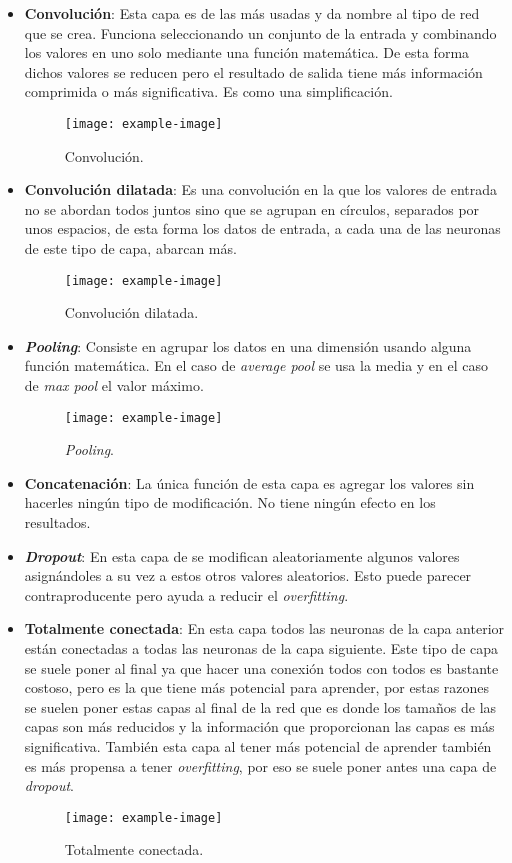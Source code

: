 \documentclass[12pt,a4paper]{article}
\begin{document}
\begin{itemize}
\item \textbf{Convolución}: Esta capa es de las más usadas y da nombre al tipo de red que se crea. Funciona seleccionando un conjunto de la entrada y combinando los valores en uno solo mediante una función matemática. De esta forma dichos valores se reducen pero el resultado de salida tiene más información comprimida o más significativa. Es como una simplificación.
\begin{figure}[H]
\centering
\texttt{[image: example-image]}
\caption{Convolución.}
\end{figure}

\item \textbf{Convolución dilatada}: Es una convolución en la que los valores de entrada no se abordan todos juntos sino que se agrupan en círculos, separados por unos espacios, de esta forma los datos de entrada, a cada una de las neuronas de este tipo de capa, abarcan más.
\begin{figure}[H]
\centering
\texttt{[image: example-image]}
\caption{Convolución dilatada.}
\end{figure}

\item \textbf{\textit{Pooling}}: Consiste en agrupar los datos en una dimensión usando alguna función matemática. En el caso de \textit{average pool} se usa la media y en el caso de \textit{max pool} el valor máximo.
\begin{figure}[H]
\centering
\texttt{[image: example-image]}
\caption{\textit{Pooling}.}
\end{figure}

\item \textbf{Concatenación}: La única función de esta capa es agregar los valores sin hacerles ningún tipo de modificación. No tiene ningún efecto en los resultados.

\item \textbf{\textit{Dropout}}: En esta capa de se modifican aleatoriamente algunos valores asignándoles a su vez a estos otros valores aleatorios. Esto puede parecer contraproducente pero ayuda a reducir el \textit{overfitting}.

\item \textbf{Totalmente conectada}: En esta capa todos las neuronas de la capa anterior están conectadas a todas las neuronas de la capa siguiente. Este tipo de capa se suele poner al final ya que hacer una conexión todos con todos es bastante costoso, pero es la que tiene más potencial para aprender, por estas razones se suelen poner estas capas al final de la red que es donde los tamaños de las capas son más reducidos y la información que proporcionan las capas es más significativa. También esta capa al tener más potencial de aprender también es más propensa a tener \textit{overfitting}, por eso se suele poner antes una capa de \textit{dropout}.
\begin{figure}[H]
\centering
\texttt{[image: example-image]}
\caption{Totalmente conectada.}
\end{figure}


\end{itemize}
\end{document}
